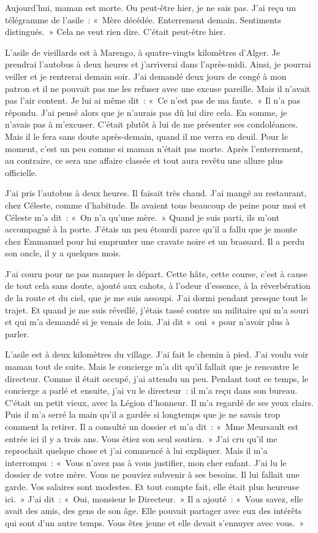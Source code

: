 \documentclass[french,twoside]{book} %
\newcommand\chaptercont{} %
\begin{document}
\chaptercont
\noindent Aujourd’hui, maman est morte. Ou peut-être hier, je ne sais pas. J'ai reçu un télégramme de l’asile : « Mère décédée. Enterrement demain. Sentiments distingués. » Cela ne veut rien dire. C'était peut-être hier.\par
L'asile de vieillards est à Marengo, à quatre-vingts kilomètres d’Alger. Je prendrai l’autobus à deux heures et j’arriverai dans l’après-midi. Ainsi, je pourrai veiller et je rentrerai demain soir. J'ai demandé deux jours de congé à mon patron et il ne pouvait pas me les refuser avec une excuse pareille. Mais il n’avait pas l’air content. Je lui ai même dit : « Ce n’est pas de ma faute. » Il n’a pas répondu. J'ai pensé alors que je n’aurais pas dû lui dire cela. En somme, je n’avais pas à m’excuser. C'était plutôt à lui de me présenter ses condoléances. Mais il le fera sans doute après-demain, quand il me verra en deuil. Pour le moment, c’est un peu comme si maman n’était pas morte. Après l’enterrement, au contraire, ce sera une affaire classée et tout aura revêtu une allure plus officielle.\par
J'ai pris l’autobus à deux heures. Il faisait très chaud. J'ai mangé au restaurant, chez Céleste, comme d’habitude. Ils avaient tous beaucoup de peine pour moi et Céleste m’a dit : « On n’a qu’une mère. » Quand je suis parti, ils m’ont accompagné à la porte. J'étais un peu étourdi parce qu’il a fallu que je monte chez Emmanuel pour lui emprunter une cravate noire et un brassard. Il a perdu son oncle, il y a quelques mois.\par
J'ai couru pour ne pas manquer le départ. Cette hâte, cette course, c’est à cause de tout cela sans doute, ajouté aux cahots, à l’odeur d’essence, à la réverbération de la route et du ciel, que je me suis assoupi. J'ai dormi pendant presque tout le trajet. Et quand je me suis réveillé, j’étais tassé contre un militaire qui m’a souri et qui m’a demandé si je venais de loin. J'ai dit « oui » pour n’avoir plus à parler.\par
L'asile est à deux kilomètres du village. J'ai fait le chemin à pied. J'ai voulu voir maman tout de suite. Mais le concierge m’a dit qu’il fallait que je rencontre le directeur. Comme il était occupé, j’ai attendu un peu. Pendant tout ce temps, le concierge a parlé et ensuite, j’ai vu le directeur : il m’a reçu dans son bureau. C'était un petit vieux, avec la Légion d’honneur. Il m’a regardé de ses yeux clairs. Puis il m’a serré la main qu’il a gardée si longtemps que je ne savais trop comment la retirer. Il a consulté un dossier et m’a dit : « Mme Meursault est entrée ici il y a trois ans. Vous étiez son seul soutien. » J'ai cru qu’il me reprochait quelque chose et j’ai commencé à lui expliquer. Mais il m’a interrompu : « Vous n’avez pas à vous justifier, mon cher enfant. J'ai lu le dossier de votre mère. Vous ne pouviez subvenir à ses besoins. Il lui fallait une garde. Vos salaires sont modestes. Et tout compte fait, elle était plus heureuse ici. » J'ai dit : « Oui, monsieur le Directeur. » Il a ajouté : « Vous savez, elle avait des amis, des gens de son âge. Elle pouvait partager avec eux des intérêts qui sont d’un autre temps. Vous êtes jeune et elle devait s’ennuyer avec vous. »\par
\end{document}
